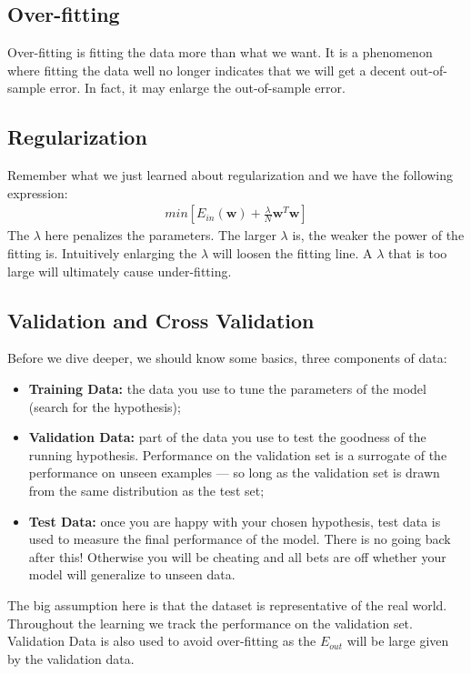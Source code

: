 \documentclass{article}
\begin{document}
\subsection{Over-fitting}
Over-fitting is fitting the data more than what we want. It is a phenomenon where fitting the data well no longer indicates that we will get a decent out-of-sample error. In fact, it may enlarge the out-of-sample error.

\subsection{Regularization}
Remember what we just learned about regularization and we have the following expression:
\begin{align*}
    min\left[ E_{in}(\bm{w}) + \frac{\lambda}{N} \bm{w}^{T}\bm{w} \right]
\end{align*}
The $\lambda$ here penalizes the parameters. The larger $\lambda$ is, the weaker the power of the fitting is. Intuitively enlarging the $\lambda$ will loosen the fitting line. A $\lambda$ that is too large will ultimately cause under-fitting.

\subsection{Validation and Cross Validation}
Before we dive deeper, we should know some basics, three components of data:
\begin{itemize}
    \item \textbf{Training Data: }the data you use to tune the parameters of the model (search for the hypothesis);
    \item \textbf{Validation Data: }part of the data you use to test the goodness of the running hypothesis. Performance on the validation set is a surrogate of the performance on unseen examples — so long as the validation set is drawn from the same distribution as the test set;
    \item \textbf{Test Data: }once you are happy with your chosen hypothesis, test data is used to measure the final performance of the model. There is no going back after this! Otherwise you will be cheating and all bets are off whether your model will generalize to unseen data.
\end{itemize}
The big assumption here is that the dataset is representative of the real world. Throughout the learning we track the performance on the validation set. Validation Data is also used to avoid over-fitting as the $E_{out}$ will be large given by the validation data.
\end{document}
